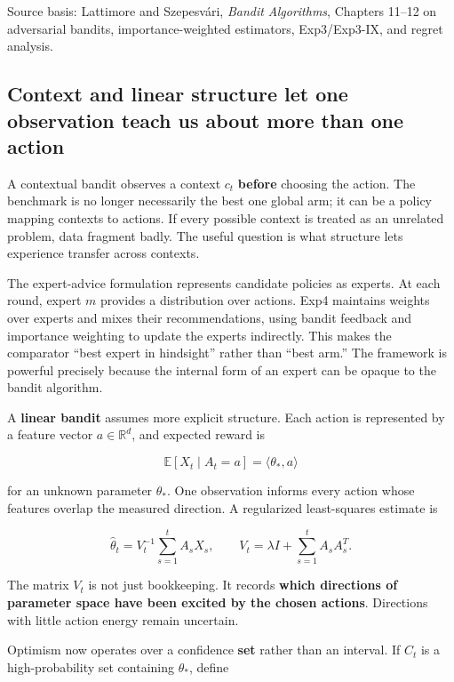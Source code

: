 Source basis: Lattimore and Szepesvári, \emph{Bandit Algorithms}, Chapters 11--12 on adversarial bandits, importance-weighted estimators, Exp3/Exp3-IX, and regret analysis.

\subsection{Context and linear structure let one observation teach us about more than one action}\label{02-foundations-ii-ch029-context-and-linear-structure-let-one-observation-teach-us-about-more-than-one-action}

A contextual bandit observes a context \(c_t\) \textbf{before} choosing the action. The benchmark is no longer necessarily the best one global arm; it can be a policy mapping contexts to actions. If every possible context is treated as an unrelated problem, data fragment badly. The useful question is what structure lets experience transfer across contexts.

The expert-advice formulation represents candidate policies as experts. At each round, expert \(m\) provides a distribution over actions. Exp4 maintains weights over experts and mixes their recommendations, using bandit feedback and importance weighting to update the experts indirectly. This makes the comparator ``best expert in hindsight'' rather than ``best arm.'' The framework is powerful precisely because the internal form of an expert can be opaque to the bandit algorithm.

A \textbf{linear bandit} assumes more explicit structure. Each action is represented by a feature vector \(a\in\mathbb R^d\), and expected reward is

\[
\mathbb E[X_t\mid A_t=a]
=
\langle \theta_*,a\rangle
\]

for an unknown parameter \(\theta_*\). One observation informs every action whose features overlap the measured direction. A regularized least-squares estimate is

\[
\hat\theta_t
=
V_t^{-1}
\sum_{s=1}^{t}A_sX_s,
\qquad
V_t
=
\lambda I+\sum_{s=1}^{t}A_sA_s^T.
\]

The matrix \(V_t\) is not just bookkeeping. It records \textbf{which directions of parameter space have been excited by the chosen actions}. Directions with little action energy remain uncertain.

Optimism now operates over a confidence \textbf{set} rather than an interval. If \(C_t\) is a high-probability set containing \(\theta_*\), define

